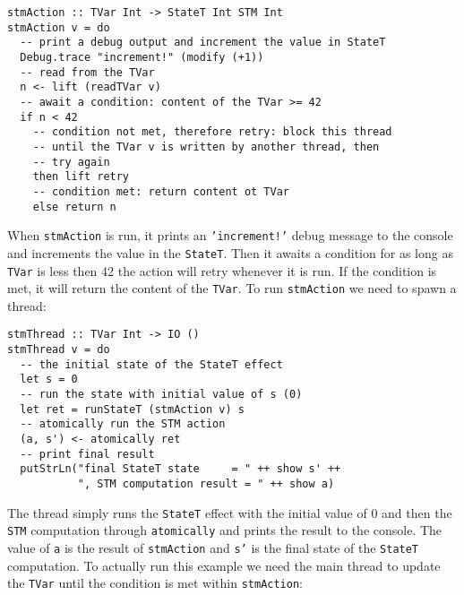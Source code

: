 \begin{footnotesize}
\begin{verbatim}
stmAction :: TVar Int -> StateT Int STM Int 
stmAction v = do
  -- print a debug output and increment the value in StateT 
  Debug.trace "increment!" (modify (+1))
  -- read from the TVar
  n <- lift (readTVar v)
  -- await a condition: content of the TVar >= 42
  if n < 42
    -- condition not met, therefore retry: block this thread
    -- until the TVar v is written by another thread, then
    -- try again
    then lift retry
    -- condition met: return content ot TVar
    else return n
\end{verbatim}
\end{footnotesize}

When \texttt{stmAction} is run, it prints an \texttt{'increment!'} debug message to the console and increments the value in the \texttt{StateT}. Then it awaits a condition for as long as \texttt{TVar} is less then 42 the action will retry whenever it is run. If the condition is met, it will return the content of the \texttt{TVar}. To run \texttt{stmAction} we need to spawn a thread:

\begin{footnotesize}
\begin{verbatim}
stmThread :: TVar Int -> IO ()
stmThread v = do
  -- the initial state of the StateT effect
  let s = 0
  -- run the state with initial value of s (0)
  let ret = runStateT (stmAction v) s
  -- atomically run the STM action
  (a, s') <- atomically ret
  -- print final result
  putStrLn("final StateT state     = " ++ show s' ++
           ", STM computation result = " ++ show a)
\end{verbatim}
\end{footnotesize}

The thread simply runs the \texttt{StateT} effect with the initial value of 0 and then the \texttt{STM} computation through \texttt{atomically} and prints the result to the console. The value of \texttt{a} is the result of \texttt{stmAction} and \texttt{s'} is the final state of the \texttt{StateT} computation. To actually run this example we need the main thread to update the \texttt{TVar} until the condition is met within \texttt{stmAction}:

